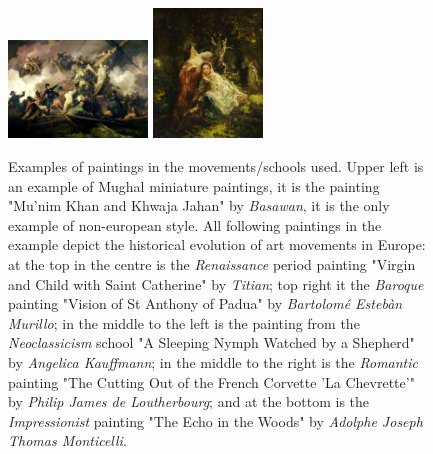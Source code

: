 \documentclass[11pt,a4paper,twoside,openright,draft]{report}
\begin{document}
\begin{multicols}{2}
\begin{figure}[tbp]
\includegraphics[width=0.33\textwidth]{loutherbourg_k264}
\includegraphics[width=0.26\textwidth]{monticelli_300}
\caption[Examples of paintings in art movements/schools]{Examples of paintings
in the movements/schools used.  Upper left is an example of Mughal miniature
paintings, it is the painting "Mu'nim Khan and Khwaja Jahan" by \emph{Basawan},
it is the only example of non-european style.  All following paintings in the
example depict the historical evolution of art movements in Europe: at the top
in the centre is the \emph{Renaissance} period painting "Virgin and Child with
Saint Catherine" by \emph{Titian};  top right it the \emph{Baroque} painting
"Vision of St Anthony of Padua" by \emph{Bartolom\'e Esteb\`an Murillo};  in
the middle to the left is the painting from the \emph{Neoclassicism} school "A
Sleeping Nymph Watched by a Shepherd" by \emph{Angelica Kauffmann}; in the
middle to the right is the \emph{Romantic} painting "The Cutting Out of the
French Corvette 'La Chevrette'" by \emph{Philip James de Loutherbourg}; and at
the bottom is the \emph{Impressionist} painting "The Echo in the Woods" by
\emph{Adolphe Joseph Thomas Monticelli}.}
\label{fig:styles}
\end{figure}

\end{multicols}
\end{document}
